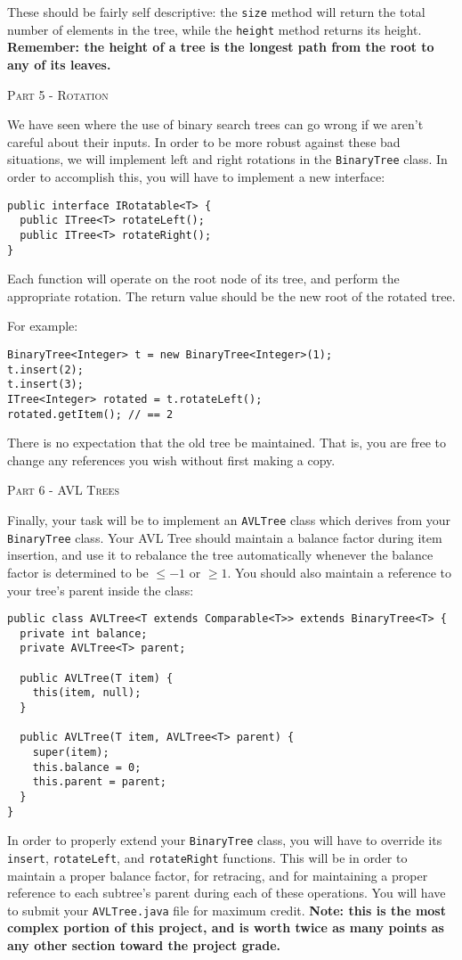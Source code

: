 \documentclass{letter}
\newcommand{\heading}[1]{{\large \textsc{#1}}}
\begin{document}
These should be fairly self descriptive: the \texttt{size} method will return
the total number of elements in the tree, while the \texttt{height} method
returns its height.  {\bf Remember: the height of a tree is the longest path
from the root to any of its leaves.}

\heading{Part 5 - Rotation}

We have seen where the use of binary search trees can go wrong if we aren't
careful about their inputs.  In order to be more robust against these bad
situations, we will implement left and right rotations in the
\texttt{BinaryTree} class.  In order to accomplish this, you will have to
implement a new interface:

\begin{verbatim}
public interface IRotatable<T> {
  public ITree<T> rotateLeft();
  public ITree<T> rotateRight();
}
\end{verbatim}

Each function will operate on the root node of its tree, and perform the
appropriate rotation.  The return value should be the new root of the rotated
tree.  

For example:

\begin{verbatim}
BinaryTree<Integer> t = new BinaryTree<Integer>(1);
t.insert(2);
t.insert(3);
ITree<Integer> rotated = t.rotateLeft();
rotated.getItem(); // == 2
\end{verbatim}

There is no expectation that the old tree be maintained.  That is, you are free
to change any references you wish without first making a copy.

\heading{Part 6 - AVL Trees}

Finally, your task will be to implement an \texttt{AVLTree} class which derives
from your \texttt{BinaryTree} class.  Your AVL Tree should maintain a balance
factor during item insertion, and use it to rebalance the tree automatically
whenever the balance factor is determined to be $\leq -1$ or $\geq 1$.  You
should also maintain a reference to your tree's parent inside the class:

\begin{verbatim}
public class AVLTree<T extends Comparable<T>> extends BinaryTree<T> {
  private int balance;
  private AVLTree<T> parent;

  public AVLTree(T item) {
    this(item, null);
  }

  public AVLTree(T item, AVLTree<T> parent) {
    super(item);
    this.balance = 0;
    this.parent = parent;
  }
}
\end{verbatim}

In order to properly extend your \texttt{BinaryTree} class, you will have to
override its \texttt{insert}, \texttt{rotateLeft}, and \texttt{rotateRight}
functions.  This will be in order to maintain a proper balance factor, for
retracing, and for maintaining a proper reference to each subtree's parent
during each of these operations.  You will have to submit your
\texttt{AVLTree.java} file for maximum credit.  {\bf Note: this is the most
complex portion of this project, and is worth twice as many points as any other
section toward the project grade.}
\end{document}
